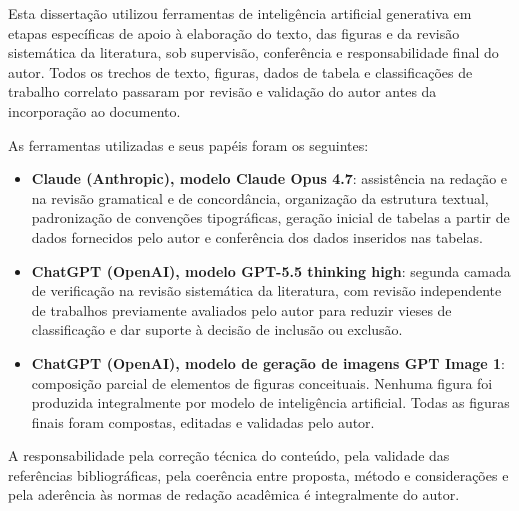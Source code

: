 
Esta dissertação utilizou ferramentas de inteligência artificial generativa em etapas específicas de apoio à elaboração do texto, das figuras e da revisão sistemática da literatura, sob supervisão, conferência e responsabilidade final do autor. Todos os trechos de texto, figuras, dados de tabela e classificações de trabalho correlato passaram por revisão e validação do autor antes da incorporação ao documento.

As ferramentas utilizadas e seus papéis foram os seguintes:

\begin{itemize}
    \item \textbf{Claude (Anthropic), modelo Claude Opus 4.7}: assistência na redação e na revisão gramatical e de concordância, organização da estrutura textual, padronização de convenções tipográficas, geração inicial de tabelas a partir de dados fornecidos pelo autor e conferência dos dados inseridos nas tabelas.

    \item \textbf{ChatGPT (OpenAI), modelo GPT-5.5 thinking high}: segunda camada de verificação na revisão sistemática da literatura, com revisão independente de trabalhos previamente avaliados pelo autor para reduzir vieses de classificação e dar suporte à decisão de inclusão ou exclusão.

    \item \textbf{ChatGPT (OpenAI), modelo de geração de imagens GPT Image 1}: composição parcial de elementos de figuras conceituais. Nenhuma figura foi produzida integralmente por modelo de inteligência artificial. Todas as figuras finais foram compostas, editadas e validadas pelo autor.
\end{itemize}

A responsabilidade pela correção técnica do conteúdo, pela validade das referências bibliográficas, pela coerência entre proposta, método e considerações e pela aderência às normas de redação acadêmica é integralmente do autor.

\cleardoublepage

